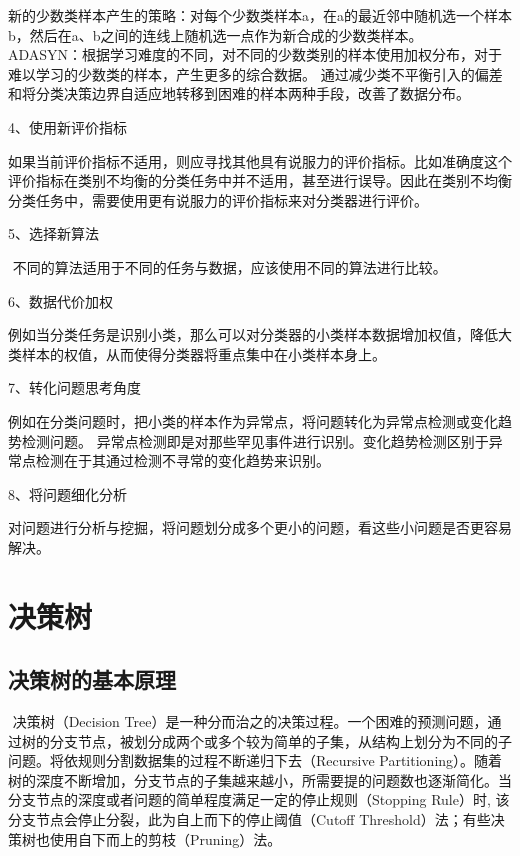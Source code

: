 ​
新的少数类样本产生的策略：对每个少数类样本a，在a的最近邻中随机选一个样本b，然后在a、b之间的连线上随机选一点作为新合成的少数类样本。\\
​
ADASYN：根据学习难度的不同，对不同的少数类别的样本使用加权分布，对于难以学习的少数类的样本，产生更多的综合数据。
通过减少类不平衡引入的偏差和将分类决策边界自适应地转移到困难的样本两种手段，改善了数据分布。

4、使用新评价指标

​
如果当前评价指标不适用，则应寻找其他具有说服力的评价指标。比如准确度这个评价指标在类别不均衡的分类任务中并不适用，甚至进行误导。因此在类别不均衡分类任务中，需要使用更有说服力的评价指标来对分类器进行评价。

5、选择新算法

​ 不同的算法适用于不同的任务与数据，应该使用不同的算法进行比较。

6、数据代价加权

​
例如当分类任务是识别小类，那么可以对分类器的小类样本数据增加权值，降低大类样本的权值，从而使得分类器将重点集中在小类样本身上。

7、转化问题思考角度

​
例如在分类问题时，把小类的样本作为异常点，将问题转化为异常点检测或变化趋势检测问题。
异常点检测即是对那些罕见事件进行识别。变化趋势检测区别于异常点检测在于其通过检测不寻常的变化趋势来识别。

8、将问题细化分析

​
对问题进行分析与挖掘，将问题划分成多个更小的问题，看这些小问题是否更容易解决。

\section{决策树}\label{ux51b3ux7b56ux6811}

\subsection{决策树的基本原理}\label{ux51b3ux7b56ux6811ux7684ux57faux672cux539fux7406}

​ 决策树（Decision
Tree）是一种分而治之的决策过程。一个困难的预测问题，通过树的分支节点，被划分成两个或多个较为简单的子集，从结构上划分为不同的子问题。将依规则分割数据集的过程不断递归下去（Recursive
Partitioning）。随着树的深度不断增加，分支节点的子集越来越小，所需要提的问题数也逐渐简化。当分支节点的深度或者问题的简单程度满足一定的停止规则（Stopping
Rule）时, 该分支节点会停止分裂，此为自上而下的停止阈值（Cutoff
Threshold）法；有些决策树也使用自下而上的剪枝（Pruning）法。

